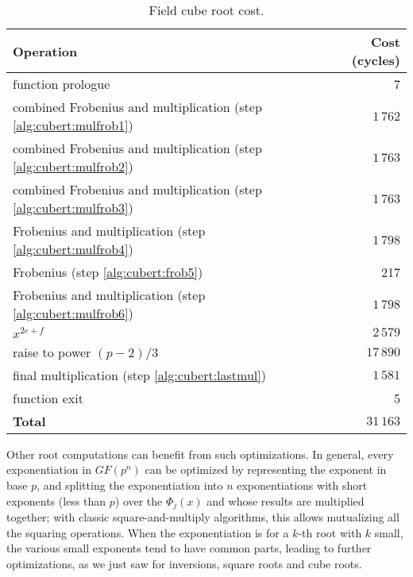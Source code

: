 \documentclass{llncs}
\newcommand{\GF}{GF}
\begin{document}
\begin{table}[H]
\begin{center}
    \begin{tabular}{|l|r|}
    \hline
    \textsf{\textbf{Operation}} & \textsf{\textbf{Cost (cycles)}} \\
    \hline
    function prologue                          &        7 \\
    combined Frobenius and multiplication (step \ref{alg:cubert:mulfrob1})  & $1\,762$ \\
    combined Frobenius and multiplication (step \ref{alg:cubert:mulfrob2})  & $1\,763$ \\
    combined Frobenius and multiplication (step \ref{alg:cubert:mulfrob3})  & $1\,763$ \\
    Frobenius and multiplication (step \ref{alg:cubert:mulfrob4})           & $1\,798$ \\
    Frobenius (step \ref{alg:cubert:frob5})      & 217 \\
    Frobenius and multiplication (step \ref{alg:cubert:mulfrob6})           & $1\,798$ \\
    $x^{2e+f}$                                 & $2\,579$ \\
    raise to power $(p-2)/3$                   & $17\,890$ \\
    final multiplication (step \ref{alg:cubert:lastmul})   & $1\,581$ \\
    function exit                              &   5 \\
    \hline
    \textsf{\textbf{Total}}                    & $31\,163$ \\
    \hline
    \end{tabular}
\end{center}
\caption{\label{tab:fieldcubert}Field cube root cost.}
\end{table}

Other root computations can benefit from such optimizations. In general,
every exponentiation in $\GF(p^n)$ can be optimized by representing the
exponent in base $p$, and splitting the exponentiation into $n$
exponentiations with short exponents (less than $p$) over the
$\Phi_j(x)$ and whose results are multiplied together; with classic
square-and-multiply algorithms, this allows mutualizing all the squaring
operations. When the exponentiation is for a $k$-th root with $k$ small,
the various small exponents tend to have common parts, leading to
further optimizations, as we just saw for inversions, square roots and
cube roots.
\end{document}
